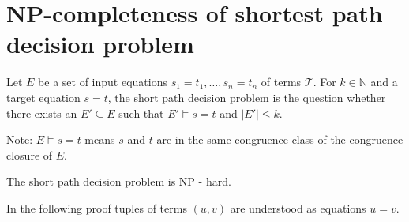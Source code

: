 \section*{NP-completeness of shortest path decision problem}

\begin{definition}

Let $E$ be a set of input equations $s_1 = t_1,\ldots,s_n = t_n$ of terms $\mathcal{T}$.
For $k \in \mathbb{N}$ and a target equation $s = t$, the short path decision problem is the question whether there exists an $E' \subseteq E$ such that $E' \models s = t$ and $|E'| \leq k$.

\end{definition}

Note: $E \models s = t$ means $s$ and $t$ are in the same congruence class of the congruence closure of $E$.

\begin{lemma}

The short path decision problem is NP - hard.

\end{lemma}

In the following proof tuples of terms $(u,v)$ are understood as equations $u = v$.

